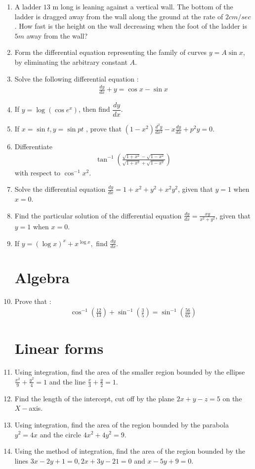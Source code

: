 \documentclass[10pt,-letter paper]{article}
\providecommand{\brak}[1]{\ensuremath{\left(#1\right)}}
\begin{document}
\begin{enumerate}
\item A ladder $13$ m long is leaning against a vertical wall. The bottom of the ladder is dragged away from the wall along the ground at the rate of $2 cm/sec$. How fast is the height on the wall decreasing when the foot of the ladder is $5 m$ away from the wall?
\item Form the differential equation representing the family of curves $y = A \sin x $, by eliminating the arbitrary constant $A$.
\item Solve the following differential equation :
	\begin{align*}
		\frac{dy}{dx}+y=\cos x - \sin x
	\end{align*}
 \item If $y = \log \brak{\cos e^x}$, then find $\dfrac{dy}{dx}$.
  \item If $x = \sin t ,  y= \sin pt$ , prove that $\brak{1-x^{2}}\frac{d^{2}y}{d x^{2}} - x \frac{dy}{dx} + p^{2}y=0$.
\item Differentiate
	\begin{align*}
		\tan^{-1}\brak{\frac{\sqrt{1+x^{2}}-\sqrt{1-x^{2}}}{\sqrt{1+x^{2}}+\sqrt{1-x^{2}}}}
	\end{align*} with respect to $\cos^{-1}x^{2}$.
 \item Solve the differential equation $\frac{dy} {dx} =1+x^{2}+y^{2}+x^{2}y^{2}$, given that $y = 1$ when $x = 0$.
\item Find the particular solution of the differential equation $\frac{dy}{dx}=\frac{xy}{x^{2}+y^{2}}$, given that $y = 1$ when $x = 0$.
\item If $y=\brak{\log x}^{x}+x^{\log x},$ find $\frac{dy}{dx}$.

\section{Algebra}

\item Prove that :
	\begin{align*}
		\cos^{-1}\brak{\frac{12}{13}}+\sin^{-1}\brak{\frac{3}{5}}=\sin^{-1} \brak{\frac{56}{65}}
	\end{align*}
 
\section{Linear forms}

\item Using integration, find the area of the smaller region bounded by the ellipse $\frac{x^{2}}{9}+\frac{y^{2}}{4}=1$ and the line $\frac{x}{3}+\frac{y}{2}=1$.
\item Find the length of the intercept, cut off by the plane $2x + y - z = 5$ on the $X -$axis.
\item Using integration, find the area of the region bounded by the parabola $y^{2}=4x$ and the circle $4x^{2}+4y^{2}=9$.
\item Using the method of integration, find the area of the region bounded by the lines $3x - 2y + 1 = 0, 2x + 3y - 21 = 0$ and $x - 5y + 9 = 0$.


\end{enumerate}
\end{document}
